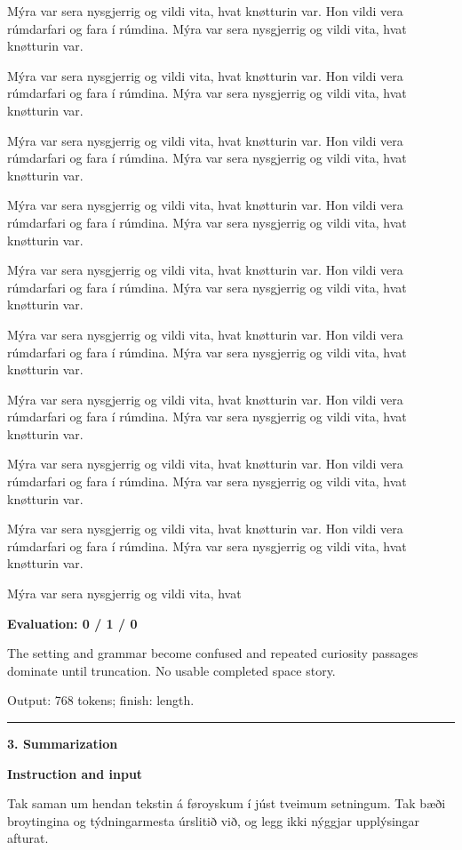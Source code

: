 \documentclass[10pt]{article}
\begin{document}
{\begin{minipage}{\textwidth}
Mýra var sera nysgjerrig og vildi vita, hvat knøtturin var. Hon vildi vera rúmdarfari og fara í rúmdina. Mýra var sera nysgjerrig og vildi vita, hvat knøtturin var.
\par\smallskip
Mýra var sera nysgjerrig og vildi vita, hvat knøtturin var. Hon vildi vera rúmdarfari og fara í rúmdina. Mýra var sera nysgjerrig og vildi vita, hvat knøtturin var.
\par\smallskip
Mýra var sera nysgjerrig og vildi vita, hvat knøtturin var. Hon vildi vera rúmdarfari og fara í rúmdina. Mýra var sera nysgjerrig og vildi vita, hvat knøtturin var.
\par\smallskip
Mýra var sera nysgjerrig og vildi vita, hvat knøtturin var. Hon vildi vera rúmdarfari og fara í rúmdina. Mýra var sera nysgjerrig og vildi vita, hvat knøtturin var.
\par\smallskip
Mýra var sera nysgjerrig og vildi vita, hvat knøtturin var. Hon vildi vera rúmdarfari og fara í rúmdina. Mýra var sera nysgjerrig og vildi vita, hvat knøtturin var.
\par\smallskip
Mýra var sera nysgjerrig og vildi vita, hvat knøtturin var. Hon vildi vera rúmdarfari og fara í rúmdina. Mýra var sera nysgjerrig og vildi vita, hvat knøtturin var.
\par\smallskip
Mýra var sera nysgjerrig og vildi vita, hvat knøtturin var. Hon vildi vera rúmdarfari og fara í rúmdina. Mýra var sera nysgjerrig og vildi vita, hvat knøtturin var.
\par\smallskip
Mýra var sera nysgjerrig og vildi vita, hvat knøtturin var. Hon vildi vera rúmdarfari og fara í rúmdina. Mýra var sera nysgjerrig og vildi vita, hvat knøtturin var.
\par\smallskip
Mýra var sera nysgjerrig og vildi vita, hvat knøtturin var. Hon vildi vera rúmdarfari og fara í rúmdina. Mýra var sera nysgjerrig og vildi vita, hvat knøtturin var.
\par\smallskip
Mýra var sera nysgjerrig og vildi vita, hvat\par\smallskip
\textbf{Evaluation: 0 / 1 / 0}\par The setting and grammar become confused and repeated curiosity passages dominate until truncation. No usable completed space story.
\par {\color{gray} Output: 768 tokens; finish: length.}\par
\medskip\hrule\smallskip
{\bfseries 3. Summarization}\par\smallskip
\textbf{Instruction and input}\par Tak saman um hendan tekstin á føroyskum í júst tveimum setningum. Tak bæði broytingina og týdningarmesta úrslitið við, og legg ikki nýggjar upplýsingar afturat.

\end{minipage}}
\end{document}
